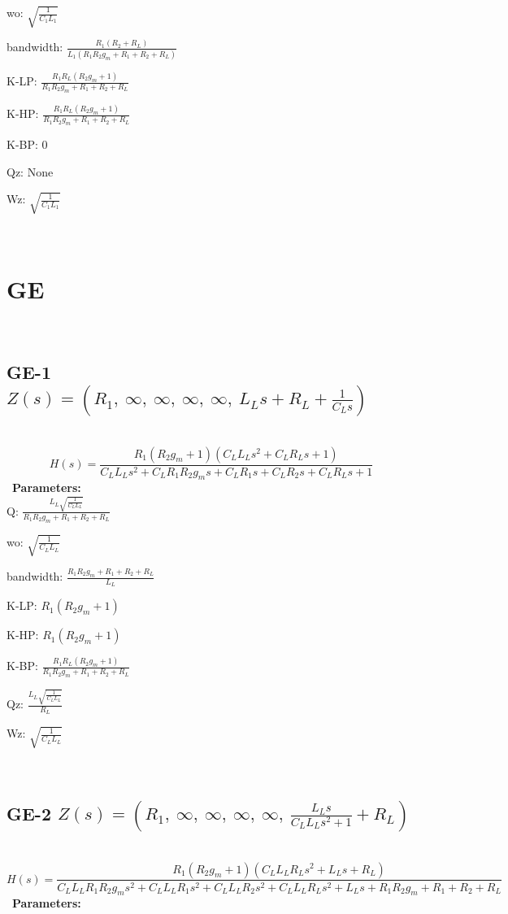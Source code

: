 \documentclass{article}
\begin{document}
wo: $\sqrt{\frac{1}{C_{1} L_{1}}}$\ 

bandwidth: $\frac{R_{1} \left(R_{2} + R_{L}\right)}{L_{1} \left(R_{1} R_{2} g_{m} + R_{1} + R_{2} + R_{L}\right)}$\ 

K-LP: $\frac{R_{1} R_{L} \left(R_{2} g_{m} + 1\right)}{R_{1} R_{2} g_{m} + R_{1} + R_{2} + R_{L}}$\ 

K-HP: $\frac{R_{1} R_{L} \left(R_{2} g_{m} + 1\right)}{R_{1} R_{2} g_{m} + R_{1} + R_{2} + R_{L}}$\ 

K-BP: $0$\ 

Qz: $\text{None}$\ 

Wz: $\sqrt{\frac{1}{C_{1} L_{1}}}$\ 

\ 

\section{GE}\ 
\subsection{GE-1 $Z(s) = \left( R_{1}, \  \infty, \  \infty, \  \infty, \  \infty, \  L_{L} s + R_{L} + \frac{1}{C_{L} s}\right)$ } \ 
\textbf{\[H(s) = \frac{R_{1} \left(R_{2} g_{m} + 1\right) \left(C_{L} L_{L} s^{2} + C_{L} R_{L} s + 1\right)}{C_{L} L_{L} s^{2} + C_{L} R_{1} R_{2} g_{m} s + C_{L} R_{1} s + C_{L} R_{2} s + C_{L} R_{L} s + 1}\] } \ 
\textbf{Parameters:}\\ 

Q: $\frac{L_{L} \sqrt{\frac{1}{C_{L} L_{L}}}}{R_{1} R_{2} g_{m} + R_{1} + R_{2} + R_{L}}$\ 

wo: $\sqrt{\frac{1}{C_{L} L_{L}}}$\ 

bandwidth: $\frac{R_{1} R_{2} g_{m} + R_{1} + R_{2} + R_{L}}{L_{L}}$\ 

K-LP: $R_{1} \left(R_{2} g_{m} + 1\right)$\ 

K-HP: $R_{1} \left(R_{2} g_{m} + 1\right)$\ 

K-BP: $\frac{R_{1} R_{L} \left(R_{2} g_{m} + 1\right)}{R_{1} R_{2} g_{m} + R_{1} + R_{2} + R_{L}}$\ 

Qz: $\frac{L_{L} \sqrt{\frac{1}{C_{L} L_{L}}}}{R_{L}}$\ 

Wz: $\sqrt{\frac{1}{C_{L} L_{L}}}$\ 

\ 

\subsection{GE-2 $Z(s) = \left( R_{1}, \  \infty, \  \infty, \  \infty, \  \infty, \  \frac{L_{L} s}{C_{L} L_{L} s^{2} + 1} + R_{L}\right)$ } \ 
\textbf{\[H(s) = \frac{R_{1} \left(R_{2} g_{m} + 1\right) \left(C_{L} L_{L} R_{L} s^{2} + L_{L} s + R_{L}\right)}{C_{L} L_{L} R_{1} R_{2} g_{m} s^{2} + C_{L} L_{L} R_{1} s^{2} + C_{L} L_{L} R_{2} s^{2} + C_{L} L_{L} R_{L} s^{2} + L_{L} s + R_{1} R_{2} g_{m} + R_{1} + R_{2} + R_{L}}\] } \ 
\textbf{Parameters:}\\ 
\end{document}
